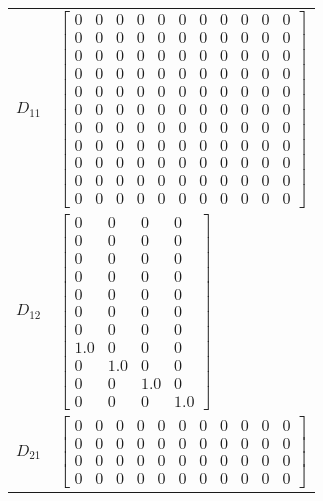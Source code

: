 \begin{tabular}{cl}
 $D_{11}$ & $\left[\begin{array}{ccccccccccc}0 & 0 & 0 & 0 & 0 & 0 & 0 & 0 & 0 & 0 & 0\\0 & 0 & 0 & 0 & 0 & 0 & 0 & 0 & 0 & 0 & 0\\0 & 0 & 0 & 0 & 0 & 0 & 0 & 0 & 0 & 0 & 0\\0 & 0 & 0 & 0 & 0 & 0 & 0 & 0 & 0 & 0 & 0\\0 & 0 & 0 & 0 & 0 & 0 & 0 & 0 & 0 & 0 & 0\\0 & 0 & 0 & 0 & 0 & 0 & 0 & 0 & 0 & 0 & 0\\0 & 0 & 0 & 0 & 0 & 0 & 0 & 0 & 0 & 0 & 0\\0 & 0 & 0 & 0 & 0 & 0 & 0 & 0 & 0 & 0 & 0\\0 & 0 & 0 & 0 & 0 & 0 & 0 & 0 & 0 & 0 & 0\\0 & 0 & 0 & 0 & 0 & 0 & 0 & 0 & 0 & 0 & 0\\0 & 0 & 0 & 0 & 0 & 0 & 0 & 0 & 0 & 0 & 0\end{array}\right]$                        \\
 $D_{12}$ & $\left[\begin{matrix}0 & 0 & 0 & 0\\0 & 0 & 0 & 0\\0 & 0 & 0 & 0\\0 & 0 & 0 & 0\\0 & 0 & 0 & 0\\0 & 0 & 0 & 0\\0 & 0 & 0 & 0\\1.0 & 0 & 0 & 0\\0 & 1.0 & 0 & 0\\0 & 0 & 1.0 & 0\\0 & 0 & 0 & 1.0\end{matrix}\right]$                                                                                                                                                                                                                                                                                                                                               \\
 $D_{21}$ & $\left[\begin{array}{ccccccccccc}0 & 0 & 0 & 0 & 0 & 0 & 0 & 0 & 0 & 0 & 0\\0 & 0 & 0 & 0 & 0 & 0 & 0 & 0 & 0 & 0 & 0\\0 & 0 & 0 & 0 & 0 & 0 & 0 & 0 & 0 & 0 & 0\\0 & 0 & 0 & 0 & 0 & 0 & 0 & 0 & 0 & 0 & 0\end{array}\right]$                                                                                                                                                                                                                                                                                                                                     \\
\hline
\end{tabular}